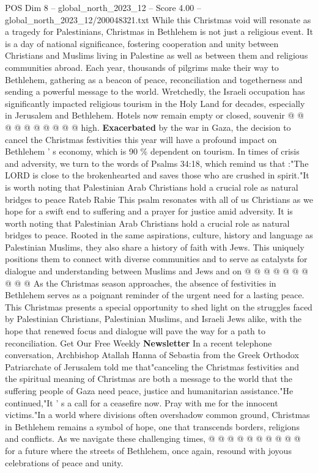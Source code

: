 \begin{textsample}{POS Dim 8 – global\_north\_2023\_12 – Score 4.00 – global\_north\_2023\_12/200048321.txt}
While this Christmas void will resonate as a tragedy for Palestinians, Christmas in Bethlehem is not just a religious event.
It is a day of national significance, fostering cooperation and unity between Christians and Muslims living in Palestine as well as between them and religious communities abroad.
Each year, thousands of pilgrims make their way to Bethlehem, gathering as a beacon of peace, reconciliation and togetherness and sending a powerful message to the world.
Wretchedly, the Israeli occupation has significantly impacted religious tourism in the Holy Land for decades, especially in Jerusalem and Bethlehem.
Hotels now remain empty or closed, souvenir @ @ @ @ @ @ @ @ @ @ high. \textbf{Exacerbated} by the war in Gaza, the decision to cancel the Christmas festivities this year will have a profound impact on Bethlehem ' s economy, which is 90 \% dependent on tourism.
In times of crisis and adversity, we turn to the words of Psalms 34:18, which remind us that :"The LORD is close to the brokenhearted and saves those who are crushed in spirit."It is worth noting that Palestinian Arab Christians hold a crucial role as natural bridges to peace Rateb Rabie This psalm resonates with all of us Christians as we hope for a swift end to suffering and a prayer for justice amid adversity.
It is worth noting that Palestinian Arab Christians hold a crucial role as natural bridges to peace.
Rooted in the same aspirations, culture, history and language as Palestinian Muslims, they also share a history of faith with Jews.
This uniquely positions them to connect with diverse communities and to serve as catalysts for dialogue and understanding between Muslims and Jews and on @ @ @ @ @ @ @ @ @ @ As the Christmas season approaches, the absence of festivities in Bethlehem serves as a poignant reminder of the urgent need for a lasting peace.
This Christmas presents a special opportunity to shed light on the struggles faced by Palestinian Christians, Palestinian Muslims, and Israeli Jews alike, with the hope that renewed focus and dialogue will pave the way for a path to reconciliation.
Get Our Free Weekly \textbf{Newsletter} In a recent telephone conversation, Archbishop Atallah Hanna of Sebastia from the Greek Orthodox Patriarchate of Jerusalem told me that"canceling the Christmas festivities and the spiritual meaning of Christmas are both a message to the world that the suffering people of Gaza need peace, justice and humanitarian assistance."He continued,"It ' s a call for a ceasefire now.
Pray with me for the innocent victims."In a world where divisions often overshadow common ground, Christmas in Bethlehem remains a symbol of hope, one that transcends borders, religions and conflicts.
As we navigate these challenging times, @ @ @ @ @ @ @ @ @ @ for a future where the streets of Bethlehem, once again, resound with joyous celebrations of peace and unity.

\end{textsample}
